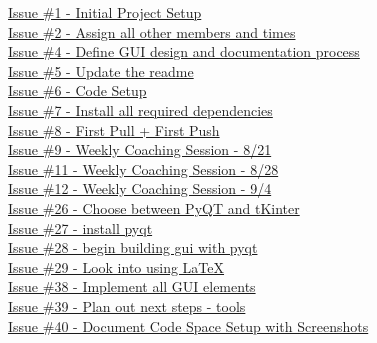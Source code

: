 \documentclass{article}
\begin{document}
\href{https://github.com/zachA214/Adelson_Senior_Capstone/issues/1}{Issue \#1 - Initial Project Setup} \\
\href{https://github.com/zachA214/Adelson_Senior_Capstone/issues/2}{Issue \#2 - Assign all other members and times} \\
\href{https://github.com/zachA214/Adelson_Senior_Capstone/issues/4}{Issue \#4 - Define GUI design and documentation process} \\ 
\href{https://github.com/zachA214/Adelson_Senior_Capstone/issues/5}{Issue \#5 - Update the readme} \\
\href{https://github.com/zachA214/Adelson_Senior_Capstone/issues/6}{Issue \#6 - Code Setup} \\
\href{https://github.com/zachA214/Adelson_Senior_Capstone/issues/7}{Issue \#7 - Install all required dependencies} \\
\href{https://github.com/zachA214/Adelson_Senior_Capstone/issues/8}{Issue \#8 - First Pull + First Push} \\
\href{https://github.com/zachA214/Adelson_Senior_Capstone/issues/9}{Issue \#9 - Weekly Coaching Session - 8/21} \\
\href{https://github.com/zachA214/Adelson_Senior_Capstone/issues/11}{Issue \#11 - Weekly Coaching Session - 8/28} \\
\href{https://github.com/zachA214/Adelson_Senior_Capstone/issues/12}{Issue \#12 - Weekly Coaching Session - 9/4} \\
\href{https://github.com/zachA214/Adelson_Senior_Capstone/issues/26}{Issue \#26 - Choose between PyQT and tKinter} \\ 
\href{https://github.com/zachA214/Adelson_Senior_Capstone/issues/27}{Issue \#27 - install pyqt} \\
\href{https://github.com/zachA214/Adelson_Senior_Capstone/issues/28}{Issue \#28 - begin building gui with pyqt} \\
\href{https://github.com/zachA214/Adelson_Senior_Capstone/issues/29}{Issue \#29 - Look into using LaTeX} \\
\href{https://github.com/zachA214/Adelson_Senior_Capstone/issues/38}{Issue \#38 - Implement all GUI elements} \\
\href{https://github.com/zachA214/Adelson_Senior_Capstone/issues/39}{Issue \#39 - Plan out next steps - tools} \\
\href{https://github.com/zachA214/Adelson_Senior_Capstone/issues/40}{Issue \#40 - Document Code Space Setup with Screenshots} \\
\end{document}
